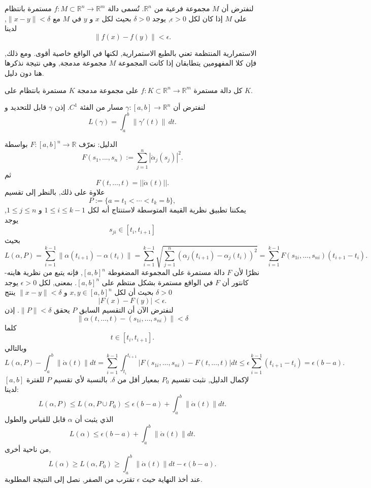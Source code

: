 \begin{definition}
لنفترض أن \( M \) مجموعة فرعية من \( \mathbb{R}^n \). تُسمى دالة \( f : M \subset \mathbb{R}^n \to \mathbb{R}^m \) مستمرة بانتظام على \( M \) إذا كان لكل \( \epsilon > 0 \), يوجد \( \delta > 0 \) بحيث لكل \( x \) و \( y \) في \( M \) مع \( \|x - y\| < \delta \), لدينا
\[ \|f(x) - f(y)\| < \epsilon. \]
\end{definition}

الاستمرارية المنتظمة تعني بالطبع الاستمرارية, لكنها في الواقع خاصية أقوى. ومع ذلك, فإن كلا المفهومين يتطابقان إذا كانت المجموعة \( M \) مجموعة مدمجة, وهي نتيجة نذكرها هنا دون دليل.

\begin{theoreme}
كل دالة مستمرة \( f : K \subset \mathbb{R}^n \to \mathbb{R}^m \) على مجموعة مدمجة \( K \) مستمرة بانتظام على \( K \).
\end{theoreme}

\begin{theoreme}
لنفترض أن \( \gamma : [a, b] \to \mathbb{R}^n \) مسار من الفئة \( C^1 \). إذن \( \gamma \) قابل للتحديد و
\[
L(\gamma) = \int_a^b \|\gamma'(t)\| \, dt.
\]
\end{theoreme}

\begin{demonstration}
الدليل: نعرّف \(F : [a, b]^n \to \mathbb{R}\) بواسطة
\[ F(s_1, \ldots, s_n) := \sum_{j=1}^n |\dot{\alpha}_j(s_j)|^2. \]
ثم
\[ F(t, \ldots, t) = ||\dot{\alpha}(t)||. \]
علاوة على ذلك, بالنظر إلى تقسيم
\[ P := \{a = t_1 < \cdots < t_k = b\}, \]
يمكننا تطبيق نظرية القيمة المتوسطة لاستنتاج أنه لكل \(1 \leq i \leq k - 1\) و \(1 \leq j \leq n\), يوجد
\[ s_{ji} \in [t_i, t_{i+1}] \]
بحيث
\[ L(\alpha, P) = \sum_{i=1}^{k-1} \|\alpha(t_{i+1}) - \alpha(t_i)\| = \sum_{i=1}^{k-1} \sqrt{\sum_{j=1}^n (\alpha_j(t_{i+1}) - \alpha_j(t_i))^2} = \sum_{i=1}^{k-1} F(s_{1i}, \ldots, s_{ni})(t_{i+1} - t_i). \]
نظرًا لأن \(F\) دالة مستمرة على المجموعة المضغوطة \([a, b]^n\), فإنه يتبع من نظرية هاينه-كانتور أن \(F\) في الواقع مستمرة بشكل منتظم على \([a, b]^n\). بمعنى, لكل \(\epsilon > 0\) يوجد \(\delta > 0\) بحيث أن لكل \(x, y \in [a, b]^n\) و \(\|x - y\| < \delta\) ينتج
\[ |F(x) - F(y)| < \epsilon. \]
لنفترض الآن أن التقسيم السابق \(P\) يحقق \(\|P\| < \delta\). إذن
\[ \|\alpha(t, \ldots, t) - (s_{1i}, \ldots, s_{ni})\| < \delta \]
كلما
\[ t \in [t_i, t_{i+1}]. \]
وبالتالي
\[ L(\alpha, P) - \int_a^b \|\dot{\alpha}(t)\| dt = \sum_{i=1}^{k-1} \int_{t_i}^{t_{i+1}} |F(s_{1i}, \ldots, s_{ni}) - F(t, \ldots, t)| dt \leq \epsilon \sum_{i=1}^{k-1} (t_{i+1} - t_i) = \epsilon (b - a). \]
لإكمال الدليل, نثبت تقسيم \(P_0\) بمعيار أقل من \(\delta\). بالنسبة لأي تقسيم \(P\) للفترة \([a, b]\) لدينا:
\[ L(\alpha, P) \leq L(\alpha, P \cup P_0) \leq \epsilon (b - a) + \int_a^b \|\dot{\alpha}(t)\| dt. \]
الذي يثبت أن \(\alpha\) قابل للقياس والطول
\[ L(\alpha) \leq \epsilon (b - a) + \int_a^b \|\dot{\alpha}(t)\| dt. \]
 \breakbox
من ناحية أخرى,
\[ L(\alpha) \geq L(\alpha, P_0) \geq \int_a^b \|\dot{\alpha}(t)\| dt - \epsilon (b - a). \]
عند أخذ النهاية حيث \(\epsilon\) تقترب من الصفر, نصل إلى النتيجة المطلوبة.
\end{demonstration}

